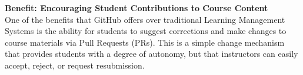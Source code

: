 



\textbf{Benefit: Encouraging Student Contributions to Course Content} \\
One of the benefits that GitHub offers over traditional Learning Management Systems is the ability for students to suggest corrections and make changes to course materials via Pull Requests (PRs). This is a simple change mechanism that provides students with a degree of autonomy, but that instructors can easily accept, reject, or request resubmission.

